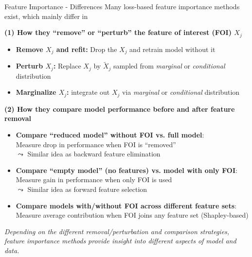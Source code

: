 \documentclass[10pt,compress,t,notes=noshow, xcolor=table]{beamer}
\begin{document}
\begin{frame}{Feature Importance - Differences }
Many loss-based feature importance methods exist, which mainly differ in

\medskip

\textbf{(1) How they ``remove'' or ``perturb'' the feature of interest (FOI) $X_j$}
\begin{itemize}
  \item \textbf{Remove $X_j$ and refit:} Drop the $X_j$ and retrain model without it %
  \item \textbf{Perturb $X_j$:} Replace $X_j$ by $\tilde X_j$ sampled from  
        \textit{marginal} or \textit{conditional} distribution %
  \item \textbf{Marginalize $X_j$:} integrate out $X_j$ via  
        \textit{marginal} or \textit{conditional} distribution %
\end{itemize}

\pause\medskip

\textbf{(2) How they compare model performance before and after feature removal}
\begin{itemize}
     \item \textbf{Compare ``reduced model'' without FOI vs. full model}: \\
     Measure drop in performance when FOI is ``removed'' \\
    $\leadsto$ Similar idea as backward feature elimination  %
    \item \textbf{Compare ``empty model'' (no features) vs. model with only FOI}: \\
    Measure gain in performance when only FOI is used \\
    $\leadsto$ Similar idea as forward feature selection %
    \item \textbf{Compare models with/without FOI across different feature sets}: \\
    Measure average contribution when FOI joins any feature set (Shapley-based) %
\end{itemize}

\pause \medskip

\textit{Depending on the different removal/perturbation and comparison strategies, feature importance methods provide insight into different aspects of model and data.}
\end{frame}
\end{document}
